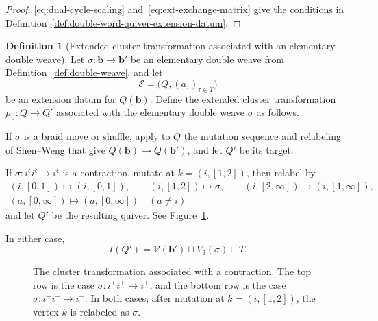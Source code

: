 \documentclass[10pt,a4paper]{article}
\theoremstyle{definition}
\newtheorem{definition}[theorem]{Definition}
\theoremstyle{remark}
\newcommand{\Vcal}{\mathcal V}
\begin{document}
\begin{proof}
\eqref{eq:dual-cycle-scaling} and~\eqref{eq:ext-exchange-matrix} give
the conditions in Definition~\ref{def:double-word-quiver-extension-datum}.
\end{proof}


\begin{definition}[Extended cluster transformation associated with an elementary double weave]
\label{def:basic-mutation-step-with-extra-vertices}
Let \(\sigma:\mathbf b\to\mathbf b'\) be an elementary double weave from
Definition~\ref{def:double-weave}, and let
\[
 \mathcal E
 =\bigl(Q,(a_\tau)_{\tau\in T}\bigr)
\]
be an extension datum for \(Q(\mathbf b)\).  Define the extended cluster
transformation \(\mu_{\sigma}:Q\to Q'\) associated with the elementary double
weave \(\sigma\) as follows.

If \(\sigma\) is a braid move or shuffle, apply to \(Q\) the mutation sequence
and relabeling of Shen--Weng \cite[Propositions~3.7 and~3.9]{ShenWeng2021}
that give \(Q(\mathbf b)\to Q(\mathbf b')\), and let \(Q'\) be its target.

If \(\sigma:i^\epsilon i^\epsilon\to i^\epsilon\) is a contraction, mutate at
\(k=(i,[1,2])\), then relabel by
\[
 \begin{gathered}
  (i,[0,1])\longmapsto(i,[0,1]),\qquad
  (i,[1,2])\longmapsto\sigma,\qquad
  (i,[2,\infty])\longmapsto(i,[1,\infty]),\\
  (a,[0,\infty])\longmapsto(a,[0,\infty])\quad(a\ne i)
 \end{gathered}
\]
and let \(Q'\) be the resulting quiver.  See
Figure~\ref{fig:contraction-quiver-mutation}.

In either case,
\[
 I(Q')=\Vcal(\mathbf b')\sqcup V_3(\sigma)\sqcup T.
\]
\end{definition}

\begin{figure}[htbp]
\centering

\caption{The cluster transformation associated with a contraction.  The top
row is the case \(\sigma:i^+i^+\to i^+\), and the bottom row is the case
\(\sigma:i^-i^-\to i^-\).  In both cases, after mutation at \(k=(i,[1,2])\),
the vertex \(k\) is relabeled as \(\sigma\).}
\label{fig:contraction-quiver-mutation}
\end{figure}
\end{document}
